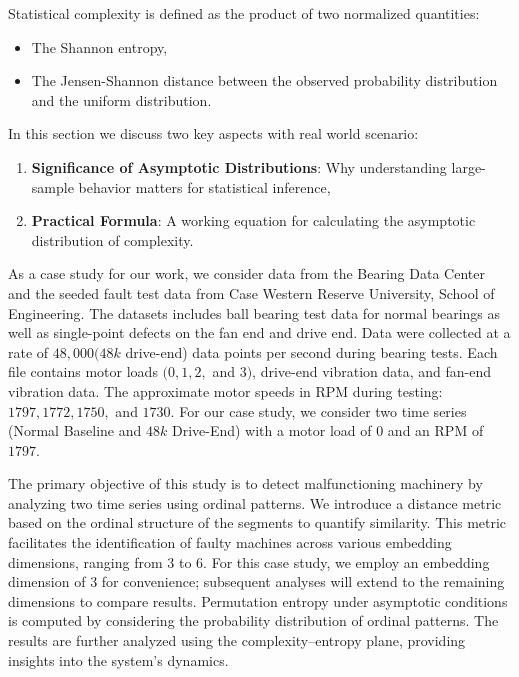 Statistical complexity is defined as the product of two normalized quantities:
\begin{itemize}
	\item The Shannon entropy,
	\item The Jensen-Shannon distance between the observed probability distribution and the uniform distribution. 
\end{itemize}

In this section we discuss two key aspects with real world scenario:
\begin{enumerate}
	\item \textbf{Significance of Asymptotic Distributions}: Why understanding large-sample behavior matters for statistical inference,
	\item \textbf{Practical Formula}: A working equation for calculating the asymptotic distribution of complexity.
\end{enumerate}

As a case study for our work, we consider data from the Bearing Data Center and the seeded fault test data from Case Western Reserve University, School of Engineering. The datasets includes ball bearing test data for normal bearings as well as single-point defects on the fan end and drive end. Data were collected at a rate of $48,000 (48k$ drive-end) data points per second during bearing tests. Each file contains motor loads $(0, 1, 2,$ and $3)$, drive-end vibration data, and fan-end vibration data. The approximate motor speeds in RPM during testing: $1797, 1772, 1750,$ and $1730$. For our case study, we consider two time series (Normal Baseline and $48k$ Drive-End) with a motor load of $0$ and an RPM of $1797$. 

The primary objective of this study is to detect malfunctioning machinery by analyzing two time series using ordinal patterns. We introduce a distance metric based on the ordinal structure of the segments to quantify similarity. This metric facilitates the identification of faulty machines across various embedding dimensions, ranging from $3$ to $6$. For this case study, we employ an embedding dimension of $3$ for convenience; subsequent analyses will extend to the remaining dimensions to compare results. Permutation entropy under asymptotic conditions is computed by considering the probability distribution of ordinal patterns. The results are further analyzed using the complexity–entropy plane, providing insights into the system's dynamics.


